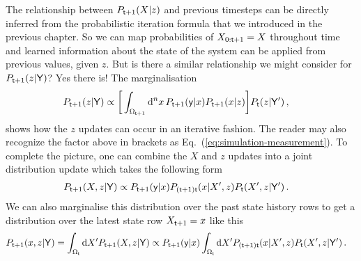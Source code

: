 The relationship between $P_{{\sf t}+1}(X\vert z)$ and previous timesteps can be directly inferred from the probabilistic iteration formula that we introduced in the previous chapter. So we can map probabilities of $X_{0:{\sf t}+1} = X$ throughout time and learned information about the state of the system can be applied from previous values, given $z$. But is there a similar relationship we might consider for $P_{{\sf t}+1}(z\vert {\sf Y})$? Yes there is! The marginalisation
\begin{align} 
P_{{\sf t}+1}(z\vert {\sf Y}) &\propto \bigg[ \int_{\Omega_{{\sf t}+1}} {\rm d}^nx \,P_{{\sf t}+1}({\sf y}\vert x) P_{{\sf t}+1}(x\vert z) \bigg] P_{{\sf t}}(z\vert {\sf Y}') \label{eq:z-update}\,,
\end{align}
shows how the $z$ updates can occur in an iterative fashion. The reader may also recognize the factor above in brackets as Eq.~(\ref{eq:simulation-measurement}). To complete the picture, one can combine the $X$ and $z$ updates into a joint distribution update which takes the following form 
\begin{align} 
P_{{\sf t}+1}(X,z\vert {\sf Y}) &\propto P_{{\sf t}+1}({\sf y}\vert x) P_{({\sf t}+1){\sf t}}(x\vert X', z) P_{{\sf t}}(X',z\vert {\sf Y}') \label{eq:x-z-update}\,.
\end{align}
We can also marginalise this distribution over the past state history rows to get a distribution over the latest state row $X_{{\sf t}+1}=x$ like this 
\begin{align}
P_{{\sf t}+1}(x,z\vert {\sf Y}) &= \int_{\Omega_{{\sf t}}} {\rm d}X'P_{{\sf t}+1}(X,z\vert {\sf Y}) \propto P_{{\sf t}+1}({\sf y}\vert x) \int_{\Omega_{{\sf t}}} {\rm d}X' P_{({\sf t}+1){\sf t}}(x\vert X', z) P_{{\sf t}}(X',z\vert {\sf Y}') \label{eq:x-z-update-latest-row} \,.
\end{align}

